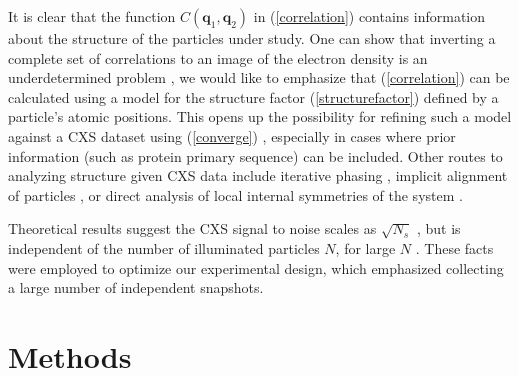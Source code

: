 \documentclass [11pt,fleqn]{article}
\begin{document}
It is clear that the function $C(\bm q_1, \bm q_2)$ in (\ref{correlation}) contains information about the structure of the particles under study. One can show that inverting a complete set of correlations to an image of the electron density is an underdetermined problem \cite{Elser:2011ez}, we would like to emphasize that (\ref{correlation}) can be calculated using a model for the structure factor (\ref{structurefactor}) defined by a particle's atomic positions. This opens up the possibility for refining such a model against a CXS dataset using (\ref{converge}) \cite{Liu:2013dv, Chen:2013io, Saldin:2009jj}, especially in cases where prior information (such as protein primary sequence) can be included. Other routes to analyzing structure given CXS data include iterative phasing \cite{Saldin:2010bx}, implicit alignment of particles \cite{Poon:2013ia}, or direct analysis of local internal symmetries of the system \cite{Kurta:2012cb, Kurta:2013to}.


Theoretical results suggest the CXS signal to noise scales as $\sqrt{N_{s}}$ , but is independent of the number of illuminated particles $N $, for large $N$ \cite{Kam:1977wc, Kam:1981ua, Kirian:2011bq}. These facts were employed to optimize our experimental design, which emphasized collecting a large number of independent snapshots.

\section{Methods}
\end{document}
